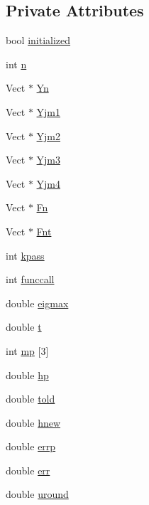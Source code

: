 \subsection*{Private Attributes}
\begin{DoxyCompactItemize}
\item 
bool \hyperlink{classrock4_a3ddb06125afe0c3588f8c4d9e6c6b1a8}{initialized}
\item 
int \hyperlink{classrock4_a2e8c8c2bb59af639b3fd8f36f9cb8862}{n}
\item 
Vect $\ast$ \hyperlink{classrock4_a2bc4f664245341808c8876e55d5073f6}{Yn}
\item 
Vect $\ast$ \hyperlink{classrock4_ad6b9fa41b5f8b013aea494c6c8c363e0}{Yjm1}
\item 
Vect $\ast$ \hyperlink{classrock4_a53b3b2890e61321bb1b8aeb27fba5525}{Yjm2}
\item 
Vect $\ast$ \hyperlink{classrock4_a6ee1b19f1ce2703d87ad46ef553a9978}{Yjm3}
\item 
Vect $\ast$ \hyperlink{classrock4_ab48779fb1b2cdbac812c6a994f7120e3}{Yjm4}
\item 
Vect $\ast$ \hyperlink{classrock4_a98e77f7c93220f078b4a7b4e7f861cc0}{Fn}
\item 
Vect $\ast$ \hyperlink{classrock4_ac350c132515ab318ab0478b00321febe}{Fnt}
\item 
int \hyperlink{classrock4_aa3a2a05c92f9b2ef019fb1e373a3020c}{kpass}
\item 
int \hyperlink{classrock4_a8f6165ff91a4e3fe6722cfe60231f968}{funccall}
\item 
double \hyperlink{classrock4_aa8b69310cc40c57eed61dcc4a65d8a91}{eigmax}
\item 
double \hyperlink{classrock4_ac246afd4597caa7119ddab97b5b62608}{t}
\item 
int \hyperlink{classrock4_ad895cc974b075c19b211f0d4d87d84e6}{mp} \mbox{[}3\mbox{]}
\item 
double \hyperlink{classrock4_aa0803ba0a5d755f9173ef4cebb3c030f}{hp}
\item 
double \hyperlink{classrock4_a9409b4c250c0972aa4571dfafb7fcc85}{told}
\item 
double \hyperlink{classrock4_a2cb273ca88d7568a5bc7a6cf5c988564}{hnew}
\item 
double \hyperlink{classrock4_a52054b64f86911a9a1af16ee2911bf33}{errp}
\item 
double \hyperlink{classrock4_aecd52981dee22a596cd85b3cbe6f1169}{err}
\item 
double \hyperlink{classrock4_a7500f319f271084c4522d7666c1e9d17}{uround}

\end{DoxyCompactItemize}
